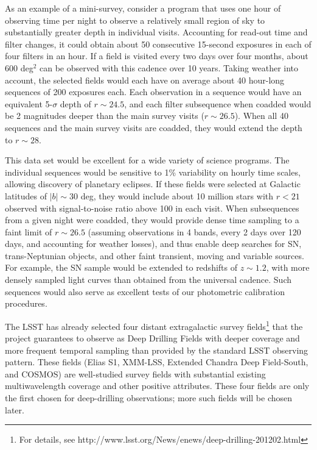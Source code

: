 As an example of a mini-survey, consider a program that uses one hour of
observing time per night to observe a relatively small region of sky to
substantially greater depth in individual visits. Accounting for
read-out time and filter changes, it could obtain about 50 consecutive
15-second exposures in each of four filters in an hour. If a field is visited
every two days over four months, about 600 deg$^2$ can be observed with this
cadence over 10 years. Taking weather into account, the selected fields would
each have on average about 40 hour-long sequences of 200 exposures each. Each
observation in a sequence would have an equivalent 5-$\sigma$ depth of
$r\sim24.5$, and each filter subsequence when coadded would be 2 magnitudes
deeper than the main survey visits ($r\sim26.5$). When all 40 sequences and
the main survey visits are coadded, they would extend the depth to $r\sim28$.

This data set would be excellent for a wide variety of science programs. The
individual sequences would be sensitive to 1\% variability on hourly time
scales, allowing discovery of planetary eclipses. If these fields were selected
at Galactic latitudes of $|b|\sim30$ deg, they would include about 10 million
stars with $r<21$ observed with signal-to-noise ratio above 100 in each visit.
When subsequences from a given night were coadded, they would
provide dense time sampling to a faint limit of $r\sim26.5$ (assuming observations
in 4 bands, every 2 days over 120 days, and accounting for weather losses), and thus
enable deep searches
for SN, trans-Neptunian objects, and other faint transient, moving and
variable sources.  For example, the SN sample
would be extended to redshifts of $z\sim1.2$, with more densely sampled light
curves than obtained from the universal cadence. Such sequences would also
serve as excellent tests of our photometric calibration procedures.

The LSST has already selected four distant extragalactic survey fields\footnote{For
details, see http://www.lsst.org/News/enews/deep-drilling-201202.html}
that the project guarantees to observe as Deep Drilling Fields with deeper coverage
and more frequent temporal sampling than provided by the standard LSST observing
pattern. These fields (Elias S1, XMM-LSS, Extended Chandra Deep Field-South, and
COSMOS) are  well-studied survey fields with substantial existing multiwavelength
coverage and other positive attributes. These four fields are only the first chosen
for deep-drilling observations; more such fields will be chosen later.

